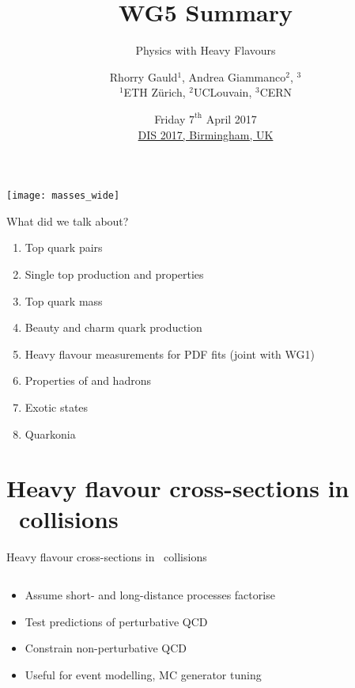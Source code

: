 \documentclass[aspectratio=1610]{beamer}
\title{WG5 Summary}
\subtitle{Physics with Heavy Flavours}
\date{%
  Friday $ 7^{\text{th}}$ April 2017\\
  \href{https://indico.cern.ch/event/568360/}{DIS 2017, Birmingham, UK}
}
\author[WG 5]{%
  \texorpdfstring{%
    Rhorry Gauld${}^{1}$,
    Andrea Giammanco${}^{2}$,
    \structure{Alex Pearce}${}^{3}$\\
    {\footnotesize ${}^{1}$ETH Z\"{u}rich, ${}^{2}$UCLouvain, ${}^{3}$CERN}
  }{%
    Rhorry Gauld (ETH Zurich),
    Andrea Giammanco (UCLouvain),
    Alex Pearce (CERN)
  }
}
\begin{document}
\begin{frame}
  \begin{center}
    \par
    \par
    \bigskip
    \texttt{[image: masses\_wide]}\par
    \bigskip
    \insertauthor\par
    \bigskip
    \insertdate\par
  \end{center}
\end{frame}

\begin{frame}{What did we talk about?}
  \begin{enumerate}
    \item Top quark pairs
    \item Single top production and properties
    \item Top quark mass
    \item Beauty and charm quark production
    \item Heavy flavour measurements for PDF fits (joint with WG1)
    \item Properties of \B and \D hadrons
    \item Exotic states
    \item Quarkonia
  \end{enumerate}
\end{frame}

\section{Heavy flavour cross-sections in \pp\ collisions}
\begin{frame}{Heavy flavour cross-sections in \pp\ collisions}
  \begin{columns}
    \begin{column}{0.5\textwidth}
      \begin{center}
        
      \end{center}
    \end{column}

    \begin{column}{0.5\textwidth}
      \begin{center}
        
      \end{center}
    \end{column}
  \end{columns}
  \bigskip
  \begin{itemize}
    \item Assume short- and long-distance processes factorise
    \item Test predictions of perturbative QCD
    \item Constrain non-perturbative QCD
    \item Useful for event modelling, MC generator tuning
  \end{itemize}
\end{frame}
\end{document}
